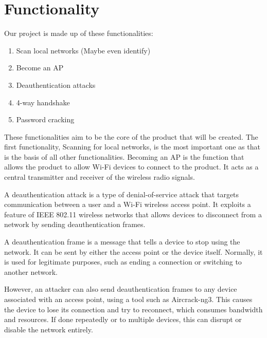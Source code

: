 \section{Functionality}
Our project is made up of these functionalities:
\begin{enumerate}
    \item Scan local networks (Maybe even identify)
    \item Become an AP
    \item Deauthentication attacks
    \item 4-way handshake
    \item Password cracking
\end{enumerate}

 
These functionalities aim to be the core of the product that will be created. The first functionality, Scanning for local networks, is the most important one as that is the basis of all other functionalities. 
Becoming an AP is the function that allows the product to allow Wi-Fi devices to connect to the product. It acts as a central transmitter and receiver of the wireless radio signals. 

A deauthentication attack is a type of denial-of-service attack that targets communication between a user and a Wi-Fi wireless access point. It exploits a feature of IEEE 802.11 wireless networks that allows devices to disconnect from a network by sending deauthentication frames.

A deauthentication frame is a message that tells a device to stop using the network. It can be sent by either the access point or the device itself. Normally, it is used for legitimate purposes, such as ending a connection or switching to another network.

However, an attacker can also send deauthentication frames to any device associated with an access point, using a tool such as Aircrack-ng3. This causes the device to lose its connection and try to reconnect, which consumes bandwidth and resources. If done repeatedly or to multiple devices, this can disrupt or disable the network entirely.

